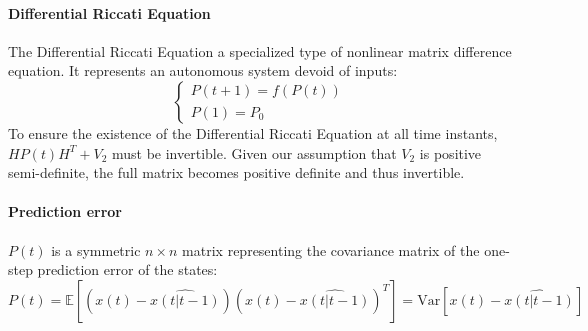 \paragraph*{Differential Riccati Equation}
The Differential Riccati Equation a specialized type of nonlinear matrix difference equation. 
It represents an autonomous system devoid of inputs:
\[\begin{cases}
    P(t+1)=f(P(t)) \\
    P(1)=P_0
\end{cases}\]
To ensure the existence of the Differential Riccati Equation at all time instants, $HP(t)H^T+V_2$ must be invertible. 
Given our assumption that $V_2$ is positive semi-definite, the full matrix becomes positive definite and thus invertible.

\paragraph*{Prediction error}
$P(t)$ is a symmetric $n \times n$  matrix representing the covariance matrix of the one-step prediction error of the states:
\[P(t)=\mathbb{E}\left[\left(x(t)-\hat{x(t|t-1)}\right)\left(x(t)-\hat{x(t|t-1)}\right)^T\right]=\text{Var}\left[x(t)-\hat{x(t|t-1)}\right]\]

